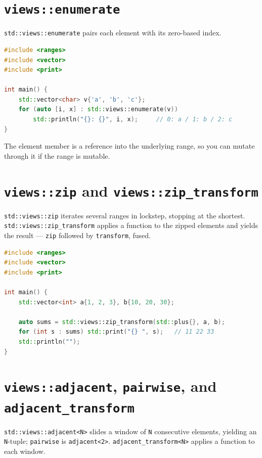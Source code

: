 \section{\texttt{views::enumerate}}

\lstinline|std::views::enumerate| pairs each element with its zero-based index.

\begin{lstlisting}[language=C++, caption={Enumerating a range}]
#include <ranges>
#include <vector>
#include <print>

int main() {
    std::vector<char> v{'a', 'b', 'c'};
    for (auto [i, x] : std::views::enumerate(v))
        std::println("{}: {}", i, x);     // 0: a / 1: b / 2: c
}
\end{lstlisting}

The element member is a reference into the underlying range, so you can mutate through it if the range is mutable.

\section{\texttt{views::zip} and \texttt{views::zip\_transform}}

\lstinline|std::views::zip| iterates several ranges in lockstep, stopping at the shortest. \lstinline|std::views::zip_transform| applies a function to the zipped elements and yields the result --- \lstinline|zip| followed by \lstinline|transform|, fused.

\begin{lstlisting}[language=C++, caption={Element-wise vector addition with zip_transform}]
#include <ranges>
#include <vector>
#include <print>

int main() {
    std::vector<int> a{1, 2, 3}, b{10, 20, 30};

    auto sums = std::views::zip_transform(std::plus{}, a, b);
    for (int s : sums) std::print("{} ", s);   // 11 22 33
    std::println("");
}
\end{lstlisting}

\section{\texttt{views::adjacent}, \texttt{pairwise}, and \texttt{adjacent\_transform}}

\lstinline|std::views::adjacent<N>| slides a window of \lstinline|N| consecutive elements, yielding an \lstinline|N|-tuple; \lstinline|pairwise| is \lstinline|adjacent<2>|. \lstinline|adjacent_transform<N>| applies a function to each window.

